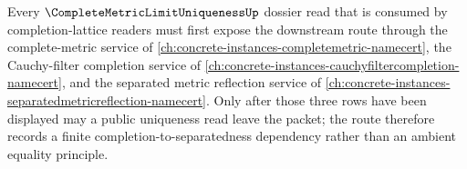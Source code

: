 Every $\CompleteMetricLimitUniquenessUp$ dossier read that is consumed by completion-lattice readers must first expose the downstream route through the complete-metric service of \autoref{ch:concrete-instances-completemetric-namecert}, the Cauchy-filter completion service of \autoref{ch:concrete-instances-cauchyfiltercompletion-namecert}, and the separated metric reflection service of \autoref{ch:concrete-instances-separatedmetricreflection-namecert}. Only after those three rows have been displayed may a public uniqueness read leave the packet; the route therefore records a finite completion-to-separatedness dependency rather than an ambient equality principle.
